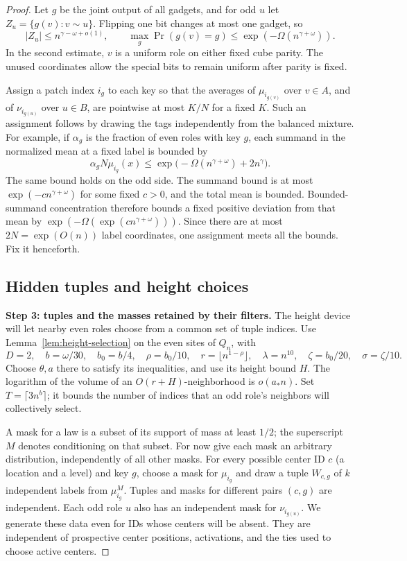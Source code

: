 \begin{proof}
Let \(g\) be the joint output of all gadgets, and for odd \(u\) let
\(Z_u=\{g(v):v\sim u\}\). Flipping one bit changes at most one gadget,
so
\[
 |Z_u|\le n^{\gamma-\omega+o(1)},\qquad
 \max_g\Pr(g(v)=g)\le\exp(-\Omega(n^{\gamma+\omega})).
\]
In the second estimate, \(v\) is a uniform role on either fixed cube
parity. The unused coordinates allow the special bits to remain uniform
after parity is fixed.

Assign a patch index \(i_g\) to each key so that the averages of
\(\mu_{i_{g(v)}}\) over \(v\in A\), and of \(\nu_{i_{g(u)}}\) over
\(u\in B\), are pointwise at most \(K/N\) for a fixed \(K\).
Such an assignment follows by drawing the tags independently from the
balanced mixture. For example, if \(\alpha_g\) is the fraction of even
roles with key \(g\), each summand in the normalized mean at a fixed
label is bounded by
\[
 \alpha_g N\mu_{i_g}(x)
 \le \exp\bigl(-\Omega(n^{\gamma+\omega})+2n^\gamma\bigr).
\]
The same bound holds on the odd side. The summand bound is at most
\(\exp(-c n^{\gamma+\omega})\) for some fixed \(c>0\), and the total
mean is bounded. Bounded-summand concentration therefore bounds a fixed
positive deviation from that mean by
\(\exp(-\Omega(\exp(c n^{\gamma+\omega})))\).
Since there are at most \(2N=\exp(O(n))\) label
coordinates, one assignment meets all the bounds. Fix it henceforth.

\subsection{Hidden tuples and height choices}
\label{sec:hidden-tuples-and-height-choices}

\noindent\textbf{Step 3: tuples and the masses retained by their filters.}\quad
The height device will let nearby even roles choose from a common set of
tuple indices. Use Lemma~\ref{lem:height-selection} on the even sites of
\(Q_n\), with
\[
 D=2,\quad b=\omega/30,\quad b_0=b/4,\quad \rho=b_0/10,
 \quad r=\lfloor n^{1-\rho}\rfloor,\quad \lambda=n^{10},
 \quad\zeta=b_0/20,\quad\sigma=\zeta/10.
\]
Choose \(\theta,a\) there to satisfy its inequalities, and use its height
bound \(H\). The logarithm of the volume of an \(O(r+H)\)-neighborhood
is \(o(a_*n)\). Set \(T=\lceil3n^b\rceil\); it bounds the number of
indices that an odd role's neighbors will collectively select.

A mask for a law is a subset of its support of mass at least \(1/2\);
the superscript \(M\) denotes conditioning on that subset. For now give
each mask an arbitrary distribution, independently of all other masks.
For every possible center ID \(c\) (a location and a level) and key \(g\),
choose a mask for \(\mu_{i_g}\) and draw a tuple \(W_{c,g}\) of \(k\)
independent labels from \(\mu_{i_g}^M\). Tuples and masks for different
pairs \((c,g)\) are independent. Each odd role \(u\) also has an
independent mask for \(\nu_{i_{g(u)}}\). We generate these data even for
IDs whose centers will be absent. They are independent of prospective
center positions, activations, and the ties used to choose active centers.


\end{proof}
